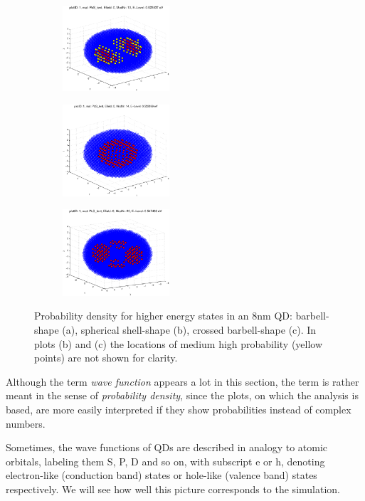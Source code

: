 \begin{figure}[htbp]
	\centering
	\begin{subfigure}{150px}
		\includegraphics[width=150px]{Fig/Plots/r4CBmod10}
		\caption{}
	\end{subfigure}
	\begin{subfigure}{150px}
		\includegraphics[width=150px]{Fig/Plots/r4CBmod14}
		\caption{}
	\end{subfigure}
	\begin{subfigure}{150px}
		\includegraphics[width=150px]{Fig/Plots/r4CBmod20}
		\caption{}
	\end{subfigure}
	\caption{Probability density for higher energy states in an 8nm QD: barbell-shape (a), spherical shell-shape (b), crossed barbell-shape (c). In plots (b) and (c) the locations of medium high probability (yellow points) are not shown for clarity.}
	\label{fig:HigherModWaveFn}
\end{figure}
%

\begin{REMARK}
Although the term \textit{wave function} appears a lot in this section, the term is rather meant in the sense of \textit{probability density}, since the plots, on which the analysis is based, are more easily interpreted if they show probabilities instead of complex numbers.
\end{REMARK}

Sometimes, the wave functions of QDs are described in analogy to atomic orbitals, labeling them S, P, D and so on, with subscript e or h, denoting electron-like (conduction band) states or hole-like (valence band) states respectively. We will see how well this picture corresponds to the simulation.

